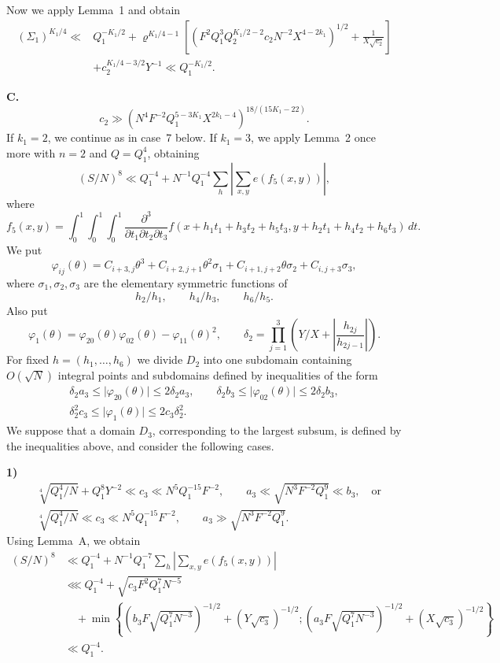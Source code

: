 \documentclass[10pt]{article}
\begin{document}
Now we apply Lemma~1 and obtain
\[
\begin{aligned}
(\Sigma_1)^{K_1/4}\ll{}&Q_1^{-K_1/2}
+\varrho^{K_1/4-1}\left[
 (F^2Q_1^3Q_2^{K_1/2-2}c_2N^{-2}X^{4-2k_1})^{1/2}
 +\frac1{X\sqrt{c_2}}
 \right]\\
&+c_2^{K_1/4-3/2}Y^{-1}
\ll Q_1^{-K_1/2}.
\end{aligned}
\]

\medskip
\noindent\textbf{C.}
\[
  c_2\gg
  (N^4F^{-2}Q_1^{5-3K_1}X^{2k_1-4})^{18/(15K_1-22)}.
\]
If $k_1=2$, we continue as in case~7 below. If $k_1=3$, we apply Lemma~2 once more with $n=2$ and $Q=Q_1^4$, obtaining
\[
  (S/N)^8\ll Q_1^{-4}
  +N^{-1}Q_1^{-4}\sum_h
   \left\lvert\sum_{x,y}e(f_5(x,y))\right\rvert,
\]
where
\[
  f_5(x,y)=\int_0^1\!\int_0^1\!\int_0^1
  \frac{\partial^3}{\partial t_1\partial t_2\partial t_3}
  f(x+h_1t_1+h_3t_2+h_5t_3,
    y+h_2t_1+h_4t_2+h_6t_3)\,dt.
\]
We put
\[
  \varphi_{ij}(\theta)=
  C_{i+3,j}\theta^3+C_{i+2,j+1}\theta^2\sigma_1
  +C_{i+1,j+2}\theta\sigma_2+C_{i,j+3}\sigma_3,
\]
where $\sigma_1,\sigma_2,\sigma_3$ are the elementary symmetric functions of
\[
  h_2/h_1,\qquad h_4/h_3,\qquad h_6/h_5.
\]
Also put
\[
  \varphi_1(\theta)=
  \varphi_{20}(\theta)\varphi_{02}(\theta)
  -\varphi_{11}(\theta)^2,
  \qquad
  \delta_2=\prod_{j=1}^3
  \left(Y/X+\left\lvert\frac{h_{2j}}{h_{2j-1}}\right\rvert\right).
\]
For fixed $h=(h_1,\ldots,h_6)$ we divide $D_2$ into one subdomain containing $O(\sqrt N)$ integral points and subdomains defined by inequalities of the form
\[
\begin{gathered}
 \delta_2a_3\leqslant\lvert\varphi_{20}(\theta)\rvert
 \leqslant2\delta_2a_3,\qquad
 \delta_2b_3\leqslant\lvert\varphi_{02}(\theta)\rvert
 \leqslant2\delta_2b_3,\\
 \delta_2^2c_3\leqslant\lvert\varphi_1(\theta)\rvert
 \leqslant2c_3\delta_2^2.
\end{gathered}
\]
We suppose that a domain $D_3$, corresponding to the largest subsum, is defined by the inequalities above, and consider the following cases.

\medskip
\noindent\textbf{1)}
\[
\begin{aligned}
&\sqrt[4]{Q_1^4/N}+Q_1^8Y^{-2}\ll c_3
 \ll N^5Q_1^{-15}F^{-2},
 \qquad
 a_3\ll\sqrt{N^3F^{-2}Q_1^9}\ll b_3,
 \quad\text{or}\\
&\sqrt[4]{Q_1^4/N}\ll c_3
 \ll N^5Q_1^{-15}F^{-2},
 \qquad
 a_3\gg\sqrt{N^3F^{-2}Q_1^9}.
\end{aligned}
\]
Using Lemma~A, we obtain
\[
\begin{aligned}
(S/N)^8
&\ll Q_1^{-4}+N^{-1}Q_1^{-7}\sum_h
 \left\lvert\sum_{x,y}e(f_5(x,y))\right\rvert\\
&\lll Q_1^{-4}+\sqrt{c_3F^2Q_1^7N^{-5}}\\
&\quad+\min\left\{
 (b_3F\sqrt{Q_1^7N^{-3}})^{-1/2}+(Y\sqrt{c_3})^{-1/2};
 (a_3F\sqrt{Q_1^7N^{-3}})^{-1/2}+(X\sqrt{c_3})^{-1/2}
 \right\}\\
&\ll Q_1^{-4}.
\end{aligned}
\]
\end{document}
